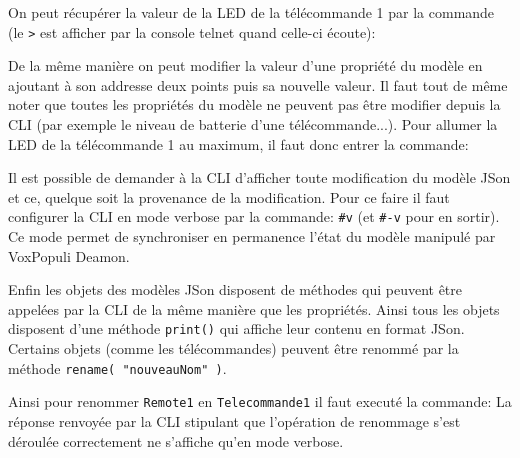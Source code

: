 \documentclass{Rapport}
\begin{document}
On peut récupérer la valeur de la LED de la télécommande 1 par la commande (le \verb|>| est afficher par la console telnet quand celle-ci écoute):


De la même manière on peut modifier la valeur d'une propriété du modèle en ajoutant à son addresse deux points puis sa nouvelle valeur. Il faut tout de même noter que toutes les propriétés du modèle ne peuvent pas être modifier depuis la CLI (par exemple le niveau de batterie d'une télécommande...). Pour allumer la LED de la télécommande 1 au maximum, il faut donc entrer la commande:


Il est possible de demander à la CLI d'afficher toute modification du modèle JSon et ce, quelque soit la provenance de la modification. Pour ce faire il faut configurer la CLI en mode verbose par la commande: \verb|#v| (et \verb|#-v| pour en sortir). Ce mode permet de synchroniser en permanence l'état du modèle manipulé par VoxPopuli Deamon.

Enfin les objets des modèles JSon disposent de méthodes qui peuvent être appelées par la CLI de la même manière que les propriétés. Ainsi tous les objets disposent d'une méthode \verb|print()| qui affiche leur contenu en format JSon. Certains objets (comme les télécommandes) peuvent être renommé par la méthode \verb|rename( "nouveauNom" )|.

Ainsi pour renommer \verb|Remote1| en \verb|Telecommande1| il faut executé la commande:
La réponse renvoyée par la CLI stipulant que l'opération de renommage s'est déroulée correctement ne s'affiche qu'en mode verbose.
\end{document}
